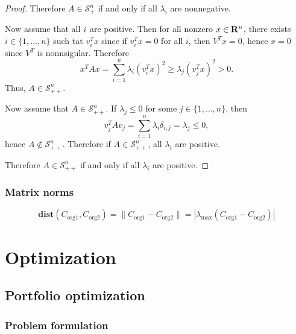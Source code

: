 \documentclass[10pt, twoside]{book}   	%
\newcommand{\possemidefset}[1]{\mathcal{S}_+^{#1}}
\newcommand{\posdefset}[1]{\mathcal{S}_{++}^{#1}}
\begin{document}
\begin{itemize}
\begin{proof}
Therefore $A\in\possemidefset{n}$ if and only if all $\lambda_i$ are nonnegative.

Now assume that all $\label_i$ are positive.
Then for all nonzero $x\in\mathbf{R}^n$,
there exists $i\in\{1,\ldots,n\}$ such tat $v_i^Tx$
since if $v_i^Tx=0$ for all $i$, then
$V^T x = 0$, hence $x=0$ since $V^T$ is nonnsigular.
Therefore
\begin{equation}
x^T A x = \sum_{i=1}^n \lambda_i (v_i^T x)^2
\geq \lambda_j (v_j^T x)^2 > 0.
\end{equation}
Thus, $A\in\posdefset{n}$.

Now assume that $A\in\posdefset{n}$.
If $\lambda_j \leq 0$ for some $j\in\{1,\ldots,n\}$,
then
\begin{equation}
v_j^T A v_j
= \sum_{i=1}^n \lambda_i \delta_{i,j}
= \lambda_j \leq 0,
\end{equation}
hence $A\not\in\posdefset{n}$. Therefore if $A\in\posdefset{n}$, all $\lambda_i$ are positive.

Therefore $A\in\posdefset{n}$ if and only if all $\lambda_i$ are positive.

\end{proof}

\end{itemize}

\section{Matrix norms}

\begin{equation}
\mathbf{dist}( C_\mathrm{org 1}, C_\mathrm{org 2} ) = 
\|C_\mathrm{org 1} - C_\mathrm{org 2} \|
= |\lambda_\mathrm{max}(C_\mathrm{org 1} - C_\mathrm{org 2})|
\end{equation}



\part{Optimization}



\chapter{Portfolio optimization}

\section{Problem formulation}
\end{document}
